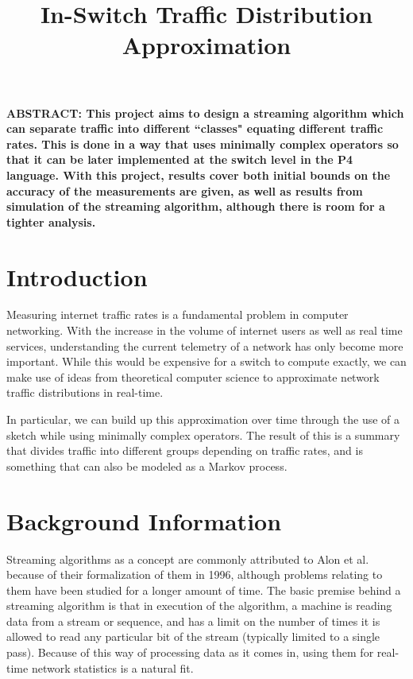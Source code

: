 \documentclass[conference]{IEEEtran}
\title{In-Switch Traffic Distribution Approximation}
\author{\IEEEauthorblockN{Sean Bergen}
\IEEEauthorblockA{\textit{School of Computing and Augmented Intelligence} \\
\textit{The Biodesign Institute Center for Biocomputing, Security and Society} \\
\textit{Arizona State University}\\
December 2024}}
\begin{document}
\maketitle

\textbf{ABSTRACT: This project aims to design a streaming algorithm which can separate traffic into different ``classes" equating different traffic rates.  This is done in a way that uses minimally complex operators so that it can be later implemented at the switch level in the P4 language\cite{p4}.  With this project, results cover both initial bounds on the accuracy of the measurements are given, as well as results from simulation of the streaming algorithm, although there is room for a tighter analysis.}

\section{Introduction}
Measuring internet traffic rates is a fundamental problem in computer networking.  With the increase in the volume of internet users as well as real time services, understanding the current telemetry of a network has only become more important.  While this would be expensive for a switch to compute exactly, we can make use of ideas from theoretical computer science to approximate network traffic distributions in real-time.

In particular, we can build up this approximation over time through the use of a sketch while using minimally complex operators.  The result of this is a summary that divides traffic into different groups depending on traffic rates, and is something that can also be modeled as a Markov process.

\section{Background Information}
Streaming algorithms as a concept are commonly attributed to Alon et al.\cite{noga} because of their formalization of them in 1996, although problems relating to them have been studied for a longer amount of time.  The basic premise behind a streaming algorithm is that in execution of the algorithm, a machine is reading data from a stream or sequence, and has a limit on the number of times it is allowed to read any particular bit of the stream (typically limited to a single pass).  Because of this way of processing data as it comes in, using them for real-time network statistics is a natural fit.
\end{document}
